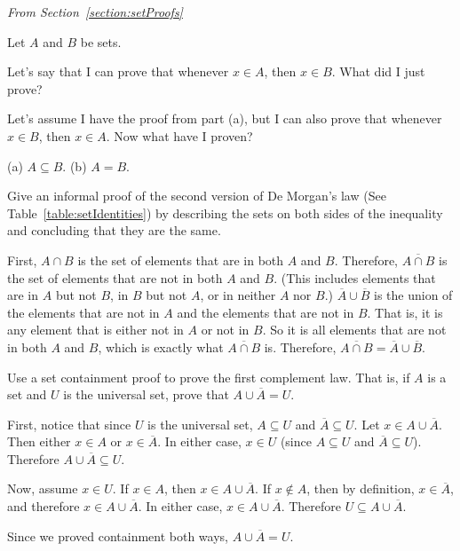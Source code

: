 \medskip

\noindent
{\em From Section~\ref{section:setProofs}}

\begin{requ}
Let $A$ and $B$ be sets.
\begin{lenum}
\item
Let's say that I can prove that whenever $x\in A$, then $x\in B$.
What did I just prove?
\item
Let's assume I have the proof from part (a), but I can also prove that 
whenever $x\in B$, then $x\in A$. Now what have I proven?
\end{lenum}
\begin{requanswer}
(a) $A\subseteq B$.
(b) $A=B$.
\end{requanswer}
\end{requ}

\begin{requ}
Give an informal proof of the second version of De Morgan's law (See Table~\ref{table:setIdentities})
by describing the sets on both sides of the inequality and concluding that they are the same.
\begin{requanswer}
First, $A\cap B$ is the set of elements that are in both $A$ and $B$. Therefore, 
$\overline{A\cap B}$  is the set of elements that are not in both $A$ and $B$.
(This includes elements that are in $A$ but not $B$, in $B$ but not $A$, or in neither $A$ nor $B$.)
$\overline{A}\cup\overline{B}$ is the union of the elements that are not in $A$ and the elements that are not in $B$.
That is, it is any element that is either not in $A$ or not in $B$. So it is all elements that are not in both $A$ and $B$,
which is exactly what $\overline{A\cap B}$ is.
Therefore, $\overline{A\cap B}= \overline{A}\cup\overline{B}$.
\end{requanswer}
\end{requ}

\begin{requ}
Use a set containment proof to prove the first complement law. 
That is, if $A$ is a set and $U$ is the universal set, prove that $A\cup \overline{A}=U$.
\begin{requanswer}
First, notice that since $U$ is the universal set, $A\subseteq U$ and $\overline{A}\subseteq U$.
Let $x\in A\cup \overline{A}$. Then either $x\in A$ or $x\in\overline{A}$.
In either case, $x\in U$ (since $A\subseteq U$ and $\overline{A}\subseteq U$). Therefore $A\cup \overline{A}\subseteq U$.

Now, assume $x\in U$.  If $x\in A$, then $x\in A\cup \overline{A}$.
If $x\not\in A$, then by definition, $x\in\overline{A}$, and therefore $x\in A\cup \overline{A}$.
In either case, $x\in A\cup \overline{A}$. Therefore $U\subseteq A\cup \overline{A}$.

Since we proved containment both ways, $A\cup \overline{A}=U$.
\end{requanswer}
\end{requ}

